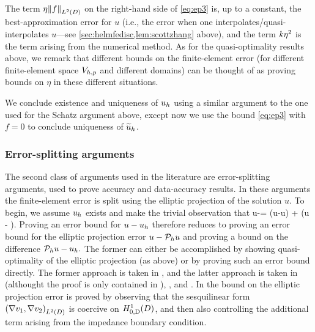 The term $\wba\NLtD{f}$ on the right-hand side of \cref{eq:ep3} is, up to a constant, the best-approximation error for $u$ (i.e., the error when one interpolates/quasi-interpolates $u$---see \cref{sec:helmfedisc,lem:scottzhang} above), and the term $k\eta^2$ is the  term arising from the numerical method. As for the quasi-optimality results above, we remark that different bounds on the finite-element error (for different finite-element space $V_{h,p}$ and different domains) can be thought of as proving bounds on $\eta$ in these different situations.

We conclude existence and uniqueness of $u_{h}$ using a similar argument to the one used for the Schatz argument above, except now we use the bound \cref{eq:ep3} with $f = 0$ to conclude uniqueness of $\widetilde{u}_{h}$.
\subsubsection{Error-splitting arguments}\label{sec:errorsplit}
The second class of arguments used in the literature are error-splitting arguments, used to prove accuracy and data-accuracy results. In these arguments the finite-element error is split using the elliptic projection of the solution $u$. To begin, we assume $u_{h}$ exists and make the trivial observation that
\beqs\label{eq:split1}
u-\uh = \mleft(u-\Ph u\mright) + \mleft(\Ph u - \uh\mright).
\eeqs
Proving an error bound for $u-u_{h}$ therefore reduces to proving an error bound for the elliptic projection error $u- \mathcal P_{h} u$ and proving a bound on the difference $\mathcal P_{h} u - u_{h}.$ The former can either be accomplished by showing quasi-optimality of the elliptic projection (as above) or by proving such an error bound directly. The former approach is taken in \cite{DuWu:15,LiWu:18,ChGaNiTo:18}, and the latter approach is taken in \cite[Lemma 5.2]{FeWu:09} (althought the proof is only contained in \cite[Lemma 5.2]{FeWu:08}), \cite[Lemma 4.3]{FeWu:11}, and \cite[Lemma 4.2]{Wu:14}. In \cite{FeWu:09,FeWu:11,Wu:14} the bound on the elliptic projection error is proved by observing that the sesquilinear form $\IPLtD{\grad \vo}{\grad \vt}$ is coercive on $\HozDD$, and then also controlling the additional term arising from the impedance boundary condition.

